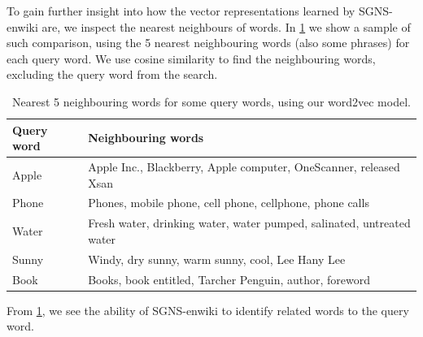 To gain further insight into how the vector representations learned by SGNS-enwiki are, we inspect the nearest neighbours of words. In \cref{table:word2vec-nearest-neighbours-words} we show a sample of such comparison, using the 5 nearest neighbouring words (also some phrases) for each query word. We use cosine similarity to find the neighbouring words, excluding the query word from the search.
\begin{table}[H]
    \centering
    \begin{tabular}{@{}ll@{}}
    \toprule
    Query word & Neighbouring words \\ \midrule
    \trcolor
    Apple        & Apple Inc., Blackberry, Apple computer, OneScanner, released Xsan \\
    Phone      & Phones, mobile phone, cell phone, cellphone, phone calls \\
    \trcolor
    Water   & Fresh water, drinking water, water pumped, salinated, untreated water \\
    Sunny      & Windy, dry sunny, warm sunny, cool, Lee Hany Lee \\
    \trcolor
    Book      & Books, book entitled, Tarcher Penguin, author, foreword \\ \bottomrule
    \end{tabular}
    \caption{Nearest 5 neighbouring words for some query words, using our word2vec model.}
    \label{table:word2vec-nearest-neighbours-words}
\end{table}
From \cref{table:word2vec-nearest-neighbours-words}, we see the ability of SGNS-enwiki to identify related words to the query word.

